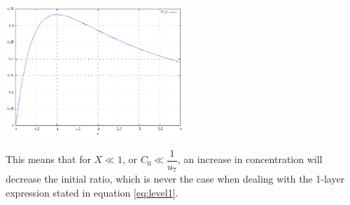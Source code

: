 \documentclass[aps,onecolumn,11pt]{revtex4}
\begin{document}
\begin{center}
	\includegraphics[width=0.5\textwidth]{f.png}
\end{center}
This means that for $X\ll 1$, or $C_0\ll\dfrac{1}{u_7}$, an increase in concentration will decrease the initial ratio, which is never the case when dealing with
the 1-layer expression stated in equation \eqref{eq:level1}.
\end{document}
